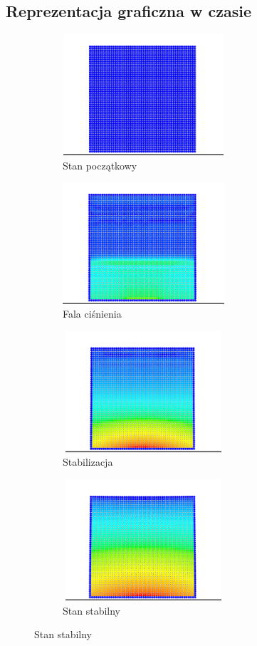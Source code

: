 \documentclass[12pt, letterpaper]{report}
\begin{document}
    \subsection{Reprezentacja graficzna w czasie}

    \begin{figure}[h]

        \begin{subfigure}{0.5\textwidth}
            \centering
            \includegraphics[width=6cm, height=4.5cm]{pressure_01.png} 
            \caption{Stan początkowy}
        \end{subfigure}
        \begin{subfigure}{0.5\textwidth}
            \centering
            \includegraphics[width=6cm, height=4.5cm]{pressure_02.png}
            \caption{Fala ciśnienia}
        \end{subfigure}
        \begin{subfigure}{0.5\textwidth}
            \centering
            \includegraphics[width=6cm, height=4.5cm]{pressure_03.png}
            \caption{Stabilizacja}
        \end{subfigure}
        \begin{subfigure}{0.5\textwidth}
            \centering
            \includegraphics[width=6cm, height=4.5cm]{pressure_04.png}
            \caption{Stan stabilny}
        \end{subfigure}
        

\end{figure}
\end{document}
